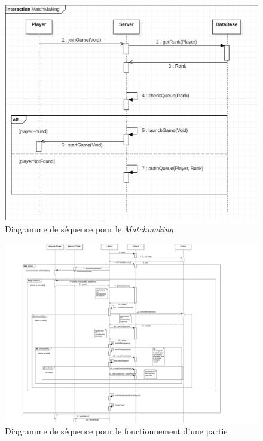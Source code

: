 \documentclass[10pt, a4paper]{article}
\begin{document}
\begin{figure}[ht]
\centering
\includegraphics[scale=0.45]{SequenceDiagramMatchmaking.PNG}
\caption{Diagramme de séquence pour le \textit{Matchmaking}}
\label{SD_matchmaker} %
\end{figure}

		\label{classicgame}
\begin{figure}[ht]
\centering
\includegraphics[scale=0.45]{SequenceDiagramClassicChessTurn.png}
\caption{Diagramme de séquence pour le fonctionnement d'une partie}
\label{SD_classicgame} %
\end{figure}
\clearpage
		
\end{document}

